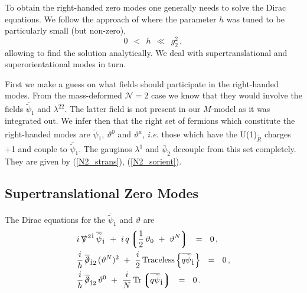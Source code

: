 \documentclass[12pt]{article}
\def\beq{\begin{equation}}
\def\eeq{\end{equation}}
\newcommand{\ntwo}{${\mathcal N}=2$ }
\newcommand{\p}{\partial}
\newcommand{\wt}{\widetilde}
\newcommand{\ov}{\overline}
\newcommand{\lgr}{\left\lgroup}
\newcommand{\rgr}{\right\rgroup}
\def\slashed#1{\setbox0=\hbox{$#1$}             %
   \dimen0=\wd0                                 %
   \setbox1=\hbox{/} \dimen1=\wd1               %
   \ifdim\dimen0>\dimen1                        %
      \rlap{\hbox to \dimen0{\hfil/\hfil}}      %
      #1                                        %
   \else                                        %
      \rlap{\hbox to \dimen1{\hfil$#1$\hfil}}   %
      /                                         %
   \fi}                                        %
\begin{document}
	To obtain the right-handed zero modes one generally needs to solve the Dirac equations.
	We follow the approach of \cite{GSYmmodel} where the parameter $ h $ was tuned to be particularly 
	small (but non-zero),
\beq
\label{smallh}
	0 ~~<~~ h ~~\ll~~ g_2^2\,,
\eeq
	allowing to find the solution analytically.
	We deal with supertranslational and superorientational modes in turn.

	First we make a guess on what fields should participate in the right-handed modes. 
	From the mass-deformed \ntwo case \cite{BSYhet} we know that they would involve
	the fields $ \ov{\wt{\psi}}{}_{\dot 1} $ and $ \lambda^{22} $.
	The latter field is not present in our $M$-model as it was integrated out.
	We infer then that the right set of fermions which constitute the right-handed modes
	are $ \ov{\wt{\psi}}{}_{\dot 1} $, $ \vartheta^0 $ and $ \vartheta^a $, {\it i.e.}
	those which have the U(1)$_{\wt R}$ charges +1 and couple to $ \ov{\wt{\psi}}{}_{\dot 1} $.
	The gauginos $ \lambda^{1} $ and $\bar{\psi}_{\dot{2}}$
        decouple from this set completely. They are given by (\ref{N2_strans}), (\ref{N2_sorient}).

\subsection{Supertranslational Zero Modes}

	The Dirac equations for the $ \ov{\wt \psi}{}_{\dot 1} $ and $ \vartheta $ are
\begin{align*}
%
&
	i\, \slashed{\nabla}^{2\dot{1}}\, \ov{\wt\psi}{}_{\dot 1}  
		~+~  i\, q \lgr \frac{1}{2}\, \vartheta_0  ~+~ \vartheta^N \rgr ~~=~~ 0\,, \\
%
&
	\frac{i}{h}\, \ov{\slashed{\p}}{}_{\dot{1}2}\, (\vartheta^N)^2
		~+~ \frac{i}{2}\, {\rm Traceless} \left\{ \ov{q \wt{\psi}}{}_{\dot 1} \right\} ~~=~~ 0\,, \\
%
&
	\frac{i}{h}\, \ov{\slashed{\p}}_{\dot{1}2}\, \vartheta^0 
		~+~ \frac{i}{N}\, {\rm Tr} \lgr \ov{q \wt{\psi}}{}_{\dot 1} \rgr ~~=~~ 0\,.
\end{align*}
\end{document}
